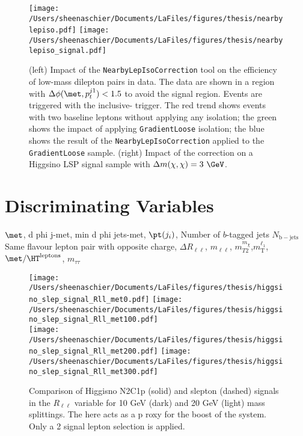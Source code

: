  \begin{figure}[tbp]
  \texttt{[image: /Users/sheenaschier/Documents/LaFiles/figures/thesis/nearbylepiso.pdf]}
   \texttt{[image: /Users/sheenaschier/Documents/LaFiles/figures/thesis/nearbylepiso\_signal.pdf]}
  \caption{(left) Impact of the \texttt{NearbyLepIsoCorrection} tool on the efficiency of low-mass dilepton pairs in data.  The data are shown in a region with $\Delta\phi(\met, p_{t}^{j1})<1.5$ to avoid the signal region.  Events are triggered with the inclusive-\met{} trigger.  The red trend shows events with two baseline leptons without applying any isolation; the green shows the impact of applying \texttt{GradientLoose} isolation; the blue shows the result of the \texttt{NearbyLepIsoCorrection} applied to the \texttt{GradientLoose} sample.  (right) Impact of the correction on a Higgsino LSP signal sample with $\Delta m(\chi,\chi)=3~\GeV$.}
 \label{fig:nearbylepiso}
 \end{figure}


\section{Discriminating Variables}
\label{sec:discvar}
$\met$, d phi j-met, min d phi jets-met, $\pt(j_i)$, Number of $b$-tagged jets $N_\mathrm{b-jets}$\\
Same flavour lepton pair with opposite charge, $\Delta R_{\ell\ell}$, $m_{\ell\ell}$, $m_{T2}^{m_{\chi}}$,$m_\text{T}^{\ell_1}$, $\met/\HT^\text{leptons}$, $m_{\tau\tau}$

  \begin{figure}[tbp]
     \texttt{[image: /Users/sheenaschier/Documents/LaFiles/figures/thesis/higgsino\_slep\_signal\_Rll\_met0.pdf]}
       \texttt{[image: /Users/sheenaschier/Documents/LaFiles/figures/thesis/higgsino\_slep\_signal\_Rll\_met100.pdf]}\\
     \texttt{[image: /Users/sheenaschier/Documents/LaFiles/figures/thesis/higgsino\_slep\_signal\_Rll\_met200.pdf]}
     \texttt{[image: /Users/sheenaschier/Documents/LaFiles/figures/thesis/higgsino\_slep\_signal\_Rll\_met300.pdf]}\\
   \caption{Comparison of Higgisno N2C1p (solid) and slepton (dashed) signals in the $R_{\ell\ell}$ variable for 10 GeV (dark) and 20 GeV (light) mass splittings. The \met{} here acts as a p    roxy for the boost of the system. Only a 2 signal lepton selection is applied.}
   \label{fig:Rll_signals only}
 \end{figure}
 
